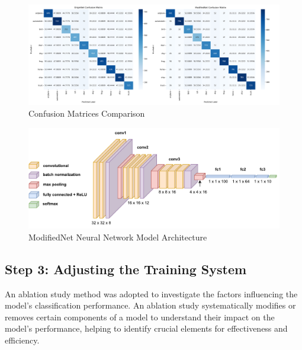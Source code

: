 \documentclass[conference]{IEEEtran}
\begin{document}
\begin{enumerate}
	\begin{figure}[htbp]
		\centerline{\includegraphics[width=\columnwidth]{images/confusion_matrices_comparison.png}}
		\caption{Confusion Matrices Comparison}
		\label{fig:confusion_matrices_comparison}
	\end{figure}
	\end{enumerate}
	
	\begin{figure}
		\centering
		\includegraphics[width=6.2in]{drawio/modifiedNet.pdf}
		\caption{ModifiedNet Neural Network Model Architecture}
		\label{fig:modified_net_arch}
	\end{figure}
	
	\subsection{Step 3: Adjusting the Training System}
	An ablation study method was adopted to investigate the factors influencing the model's classification performance. An ablation study systematically modifies or removes certain components of a model to understand their impact on the model's performance, helping to identify crucial elements for effectiveness and efficiency.
	
\end{document}
